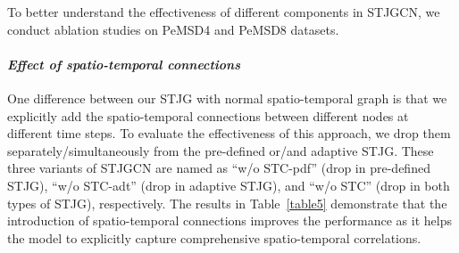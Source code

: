 \documentclass[10pt,journal,compsoc]{IEEEtran}
\begin{document}
\begin{table*}
	\caption{Effect of spatio-temporal connections, dynamic graph modeling, multi-range information, and independent fully-connected layers.}
	\label{table5}
	\centering
\end{table*}

To better understand the effectiveness of different components in STJGCN, we conduct ablation studies on PeMSD4 and PeMSD8 datasets.  

\paragraph{\textit{Effect of spatio-temporal connections}} 

One difference between our STJG with normal spatio-temporal graph is that we explicitly add the spatio-temporal connections between different nodes at different time steps. To evaluate the effectiveness of this approach, we drop them separately/simultaneously from the pre-defined or/and adaptive STJG. These three variants of STJGCN are named as ``w/o STC-pdf'' (drop in pre-defined STJG), ``w/o STC-adt'' (drop in adaptive STJG), and ``w/o STC'' (drop in both types of STJG), respectively. The results in Table~\ref{table5} demonstrate that the introduction of spatio-temporal connections improves the performance as it helps the model to explicitly capture comprehensive spatio-temporal correlations. 
\end{document}
